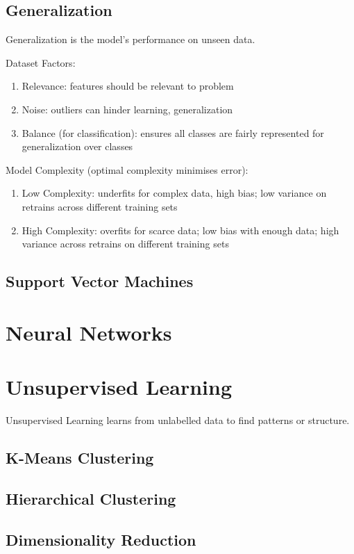 \documentclass[12pt, a4paper]{article}
\begin{document}
\begin{multicols*}{3}
\subsection{Generalization}
Generalization is the model's performance on unseen data.

Dataset Factors:
\begin{enumerate}[\roman*.]
  \item Relevance: features should be relevant to problem
  \item Noise: outliers can hinder learning, generalization 
  \item Balance (for classification): ensures all classes are fairly represented for generalization over classes
\end{enumerate}

Model Complexity (optimal complexity minimises error):
\begin{enumerate}[\roman*.]
  \item Low Complexity: underfits for complex data, high bias; low variance on retrains across different training sets 
  \item High Complexity: overfits for scarce data; low bias with enough data; high variance across retrains on different training sets 
\end{enumerate}
\vspace{-1em}
\colbreak
\subsection{Support Vector Machines}
\section{Neural Networks}
\section{Unsupervised Learning}
Unsupervised Learning learns from unlabelled data to find patterns or structure.
\subsection{K-Means Clustering}
\subsection{Hierarchical Clustering}
\subsection{Dimensionality Reduction}

\end{multicols*}
\end{document}
